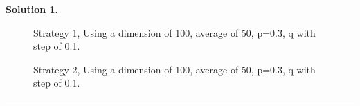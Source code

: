 \documentclass{article}
\theoremstyle{definition}
\def\fline{\rule{0.75\linewidth}{0.5pt}}
\newcommand{\finishline}{\vspace{-15pt}\begin{center}\fline\end{center}}
\newtheorem*{solution*}{Solution}
\newenvironment{solution}{\begin{solution*}}{{\finishline} \end{solution*}}
\begin{document}
\begin{solution} \hfill \\
    \begin{figure}[h]
	\centering
	\caption{Strategy 1, Using a dimension of 100, average of 50, p=0.3, q with step of 0.1.} 
	\vspace{1cm}
	\end{figure} 
    
    \begin{figure}[h]
	\centering
	\caption{Strategy 2, Using a dimension of 100, average of 50, p=0.3, q with step of 0.1.}
	\end{figure}
    

\end{solution}
\end{document}
